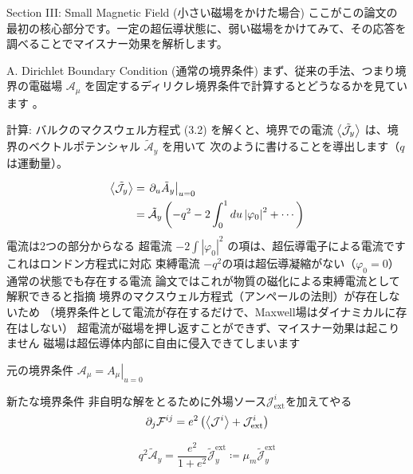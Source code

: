 \documentclass[b5paper,11pt,dvipdfmx]{jsarticle}
\numberwithin{equation}{section}
\theoremstyle{definition}
\begin{document}
Section III: Small Magnetic Field (小さい磁場をかけた場合)
ここがこの論文の最初の核心部分です。一定の超伝導状態に、弱い磁場をかけてみて、その応答を調べることでマイスナー効果を解析します。

A. Dirichlet Boundary Condition (通常の境界条件)
まず、従来の手法、つまり境界の電磁場
$\mathcal{A}_\mu$ を固定するディリクレ境界条件で計算するとどうなるかを見ています 。


計算: バルクのマクスウェル方程式 (3.2)  を解くと、境界での電流
$\ev{\tilde{\mathcal{J}}_y}$ は、境界のベクトルポテンシャル $\tilde{\mathcal{A}}_y$ を用いて
次のように書けることを導出します（$q$ は運動量）。

\begin{equation}
    \begin{split}
        \ev{\tilde{\mathcal{J}}_y}& =\left.\partial_u \tilde{A}_y\right|_{u=0} \\
        & =\tilde{\mathcal{A}}_y\left(-q^2-2 \int_0^1 d u\left|\varphi_0\right|^2+\cdots\right)
    \end{split}
\end{equation}
電流は2つの部分からなる
超電流
$-2\int |\varphi_0|^2$ の項は、超伝導電子による電流ですこれはロンドン方程式に対応
束縛電流
$-q^2$の項は超伝導凝縮がない（$\varphi_0=0$）通常の状態でも存在する電流
論文ではこれが物質の磁化による束縛電流として解釈できると指摘
境界のマクスウェル方程式（アンペールの法則）が存在しないため
（境界条件として電流が存在するだけで、Maxwell場はダイナミカルに存在はしない）
超電流が磁場を押し返すことができず、マイスナー効果は起こりません
磁場は超伝導体内部に自由に侵入できてしまいます

元の境界条件
$\mathcal{A}_\mu = \left. A_\mu \right|_{u = 0}$






新たな境界条件
非自明な解をとるために外場ソース$\mathcal{J}_{\text{ext}}^i$を加えてやる
\begin{equation}
    \partial_{j} \mathcal{F}^{ij}
    = e^{2} \left( \ev{\mathcal{J}^{i}} + \mathcal{J}_{\text{ext}}^i \right)
\end{equation}

\begin{equation}
    q^2 \tilde{\mathcal{A}}_y
    = \frac{e^2}{1 + e^2} \tilde{\mathcal{J}}^{\text{ext}}_y
    \coloneq \mu_m \tilde{\mathcal{J}}^{\text{ext}}_y
\end{equation}
\end{document}
